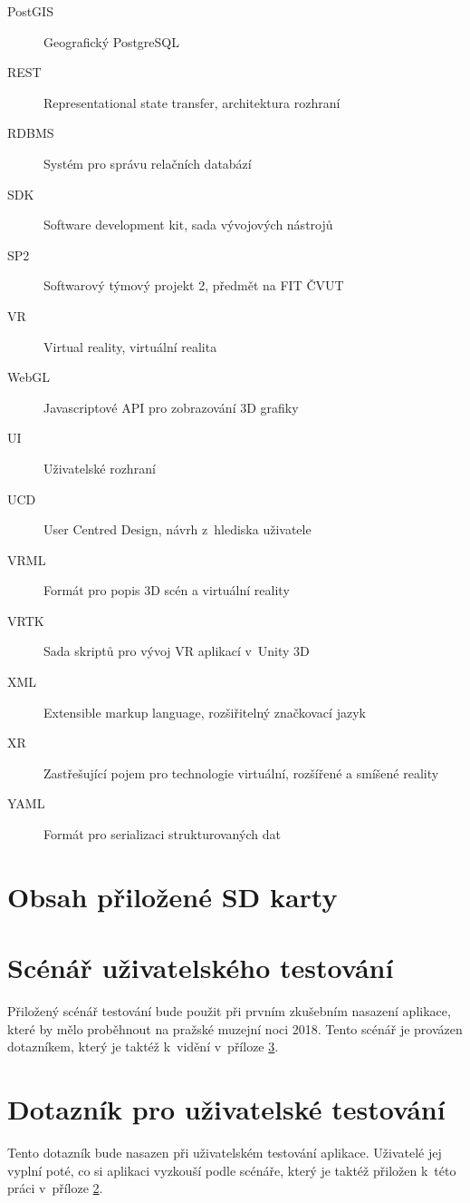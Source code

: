 \documentclass[thesis=B,czech]{FITthesis}[2012/06/26]
\begin{document}
\begin{description}
    \item[PostGIS] Geografický PostgreSQL
	\item[REST] Representational state transfer, architektura rozhraní
	\item[RDBMS] Systém pro správu relačních databází
	\item[SDK] Software development kit, sada vývojových nástrojů 
	\item[SP2] Softwarový týmový projekt 2, předmět na FIT ČVUT
	\item[VR] Virtual reality, virtuální realita
    \item[WebGL] Javascriptové API pro zobrazování 3D grafiky
    \item[UI] Uživatelské rozhraní
    \item[UCD] User Centred Design, návrh z~hlediska uživatele
    \item[VRML] Formát pro popis 3D scén a virtuální reality
    \item[VRTK] Sada skriptů pro vývoj VR aplikací v~Unity 3D
	\item[XML] Extensible markup language, rozšiřitelný značkovací jazyk
	\item[XR] Zastřešující pojem pro technologie virtuální, rozšířené a smíšené reality
	\item[YAML] Formát pro serializaci strukturovaných dat
\end{description}


\chapter{Obsah přiložené SD karty}


\begin{figure}
\end{figure}

\chapter{Scénář uživatelského testování} \label{sec:scenar}
Přiložený scénář testování bude použit při prvním zkušebním nasazení aplikace, které by mělo proběhnout na pražské muzejní noci 2018. Tento scénář je provázen dotazníkem, který je taktéž k~vidění v~příloze \ref{sec:dotaznik}.

\chapter{Dotazník pro uživatelské testování} \label{sec:dotaznik}
Tento dotazník bude nasazen při uživatelském testování aplikace. Uživatelé jej vyplní poté, co si aplikaci vyzkouší podle scénáře, který je taktéž přiložen k~této práci v~příloze \ref{sec:scenar}.


  
\end{document}
